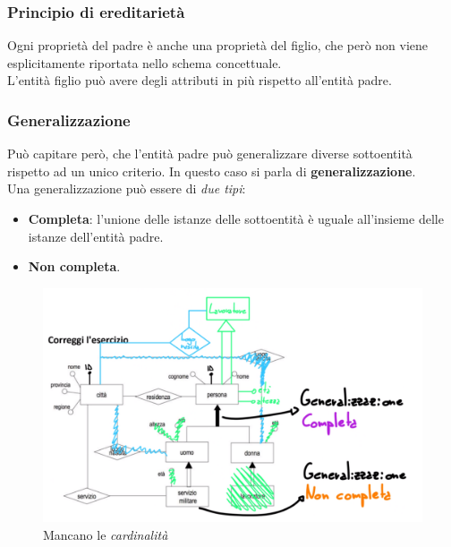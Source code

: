 \documentclass[12pt, a4paper]{article}
\begin{document}
    \subsubsection{Principio di ereditarietà}
    Ogni proprietà del padre è anche una proprietà del figlio, che però non viene esplicitamente riportata nello schema concettuale.
    \\L'entità figlio può avere degli attributi in più rispetto all'entità padre.


    \newpage
    \subsubsection{Generalizzazione}
    Può capitare però, che l'entità padre può generalizzare diverse sottoentità rispetto ad un unico criterio. 
    In questo caso si parla di \textbf{generalizzazione}.
    \\Una generalizzazione può essere di \textit{due tipi}:
    \begin{itemize}
        \item \textbf{Completa}: l'unione delle istanze delle sottoentità è uguale all'insieme delle istanze dell'entità padre.
        \item \textbf{Non completa}.
    \end{itemize}

    \begin{figure}[htbp]
        \centering
        \includegraphics[scale=0.5]{isa.png}
        \caption{Mancano le \textit{cardinalità}}
    \end{figure}


    
\end{document}
